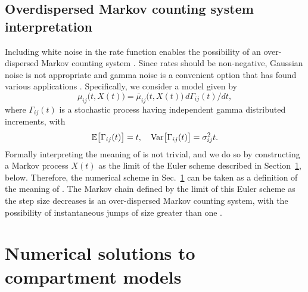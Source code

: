 \subsection{Overdispersed Markov counting system interpretation}
\label{subsec:odmcs}

Including white noise in the rate function enables the possibility of an over-dispersed Markov counting system \cite{breto11,breto09,he10}.
Since rates should be non-negative, Gaussian noise is not appropriate and gamma noise is a convenient option that has found various applications \cite{romero-severson15, subramanian20}.
Specifically, we consider a model given by
\begin{equation}
\label{eq:odmcs1}
\mu_{ij}\big(t,X(t)\big) = \bar\mu_{ij}\big(t,X(t)\big) \, d\Gamma_{ij}(t)/dt,
\end{equation}
where $\Gamma_{ij}(t)$ is a stochastic process having independent gamma distributed increments, with
\begin{equation}
\label{eq:odmcs2}
\mathbb{E}\big[\Gamma_{ij}(t)\big] = t, \quad \mathrm{Var}\big[\Gamma_{ij}(t)\big] = \sigma_{ij}^2 t.
\end{equation}
Formally interpreting the meaning of  is not trivial, and we do so by constructing a Markov process $X(t)$ as the limit of the Euler scheme described in Section~\ref{sec:numerics}, below.
Therefore, the numerical scheme in Sec.~\ref{sec:numerics} can be taken as a definition of the meaning of .
The Markov chain defined by the limit of this Euler scheme as the step size decreases is an over-dispersed Markov counting system, with the possibility of instantaneous jumps of size greater than one \cite{breto11}.

\section{Numerical solutions to compartment models}
\label{sec:numerics}

